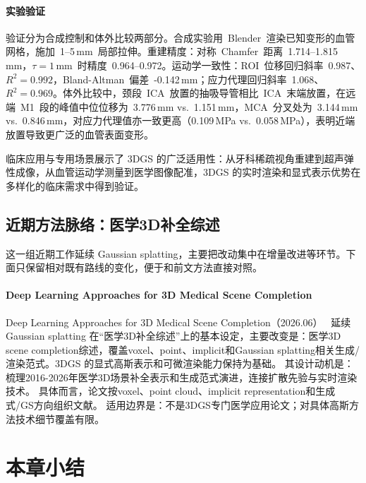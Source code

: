 \paragraph{实验验证}
验证分为合成控制和体外比较两部分。合成实验用~Blender~渲染已知变形的血管网格，施加~1--5\,mm~局部拉伸。重建精度：对称~Chamfer~距离~1.714--1.815\,mm，$\tau=1$\,mm~时精度~0.964--0.972。运动学一致性：ROI~位移回归斜率~0.987、$R^2=0.992$，Bland-Altman~偏差~-0.142\,mm；应力代理回归斜率~1.068、$R^2=0.969$。体外比较中，颈段~ICA~放置的抽吸导管相比~ICA~末端放置，在远端~M1~段的峰值中位位移为~3.776\,mm vs.\ 1.151\,mm，MCA~分叉处为~3.144\,mm vs.\ 0.846\,mm，对应力代理值亦一致更高（0.109\,MPa vs.\ 0.058\,MPa），表明近端放置导致更广泛的血管表面变形。

\begin{takeaway}
临床应用与专用场景展示了 3DGS 的广泛适用性：从牙科稀疏视角重建到超声弹性成像，从血管运动学测量到医学图像配准，3DGS 的实时渲染和显式表示优势在多样化的临床需求中得到验证。
\end{takeaway}


\subsection{近期方法脉络：医学3D补全综述}

这一组近期工作延续 Gaussian splatting，主要把改动集中在增量改进等环节。下面只保留相对既有路线的变化，便于和前文方法直接对照。

\paragraph{Deep Learning Approaches for 3D Medical Scene Completion}
Deep Learning Approaches for 3D Medical Scene Completion（2026.06）~\cite{2606_24180} 延续 Gaussian splatting 在“医学3D补全综述”上的基本设定，主要改变是：医学3D scene completion综述，覆盖voxel、point、implicit和Gaussian splatting相关生成/渲染范式。3DGS 的显式高斯表示和可微渲染能力保持为基础。
其设计动机是：梳理2016-2026年医学3D场景补全表示和生成范式演进，连接扩散先验与实时渲染技术。
具体而言，论文按voxel、point cloud、implicit representation和生成式/GS方向组织文献。
适用边界是：不是3DGS专门医学应用论文；对具体高斯方法技术细节覆盖有限。



\section*{本章小结}

